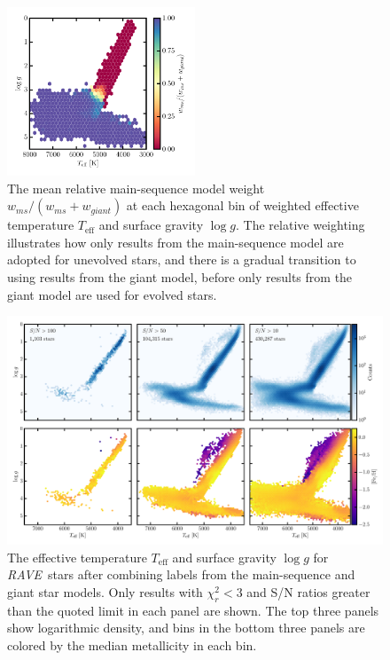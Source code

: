 \documentclass[preprint,trackchanges]{aastex}
\newcommand{\acronym}[1]{{\small{#1}}}
\newcommand{\project}[1]{\textsl{#1}}
\newcommand{\rave}{\project{\acronym{RAVE}}}
\newcommand{\teff}{T_{\mathrm{eff}}}
\newcommand{\logg}{\log g}
\begin{document}
\begin{figure}[p]
\center
\includegraphics[width=0.5\textwidth]{figures/model-weights.pdf}
\caption{The mean relative main-sequence model weight $w_{ms}/(w_{ms} + w_{giant})$ at each hexagonal bin of weighted effective temperature $\teff$ and surface gravity $\logg$.  The relative weighting illustrates how only results from the main-sequence model are adopted for unevolved stars, and there is a gradual transition to using results from the giant model, before only results from the giant model are used for evolved stars.\label{fig:model-weights}}
\end{figure}




\begin{figure}[p]
\includegraphics[width=\textwidth]{figures/hrd-test-set.pdf}
\caption{The effective temperature $\teff$ and surface gravity $\logg$ for \rave\ stars after combining labels from the main-sequence and giant star models.  Only results with $\chi_{r}^2 < 3$ and S/N ratios greater than the quoted limit in each panel are shown.  The top three panels show logarithmic density, and bins in the bottom three panels are colored by the median metallicity in each bin.\label{fig:test-set-hrd}}
\end{figure}
\end{document}
